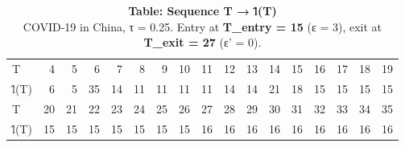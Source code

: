 \begin{table}[t]
\caption*{
{\large \textbf{Table: Sequence T → l̂(T)}} \\ 
{\small COVID-19 in China, τ = 0.25. Entry at \textbf{T\_entry = 15} (ε = 3), exit at \textbf{T\_exit = 27} (ε' = 0).}
} 
\begin{tabular*}{\linewidth}{@{\extracolsep{\fill}}lrrrrrrrrrrrrrrrr}
\toprule
 &  &  &  &  &  &  &  &  &  &  &  &  &  &  &  &  \\ 
\midrule\addlinespace[2.5pt]
T & 4 & 5 & 6 & 7 & 8 & 9 & 10 & 11 & 12 & 13 & 14 & 15 & 16 & 17 & 18 & 19 \\ 
l̂(T) & 6 & 5 & 35 & 14 & 11 & 11 & 11 & 11 & 14 & 14 & 21 & 18 & 15 & 15 & 15 & 15 \\ 
T & 20 & 21 & 22 & 23 & 24 & 25 & 26 & 27 & 28 & 29 & 30 & 31 & 32 & 33 & 34 & 35 \\ 
l̂(T) & 15 & 15 & 15 & 15 & 15 & 15 & 15 & 16 & 16 & 16 & 16 & 16 & 16 & 16 & 16 & 16 \\ 
\bottomrule
\end{tabular*}
\end{table}

